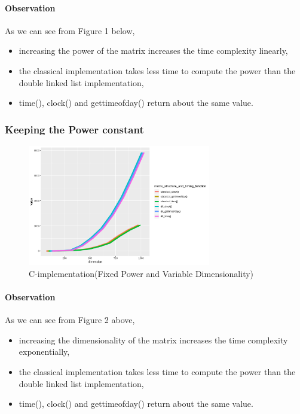 \documentclass[12pt]{article}
\begin{document}
				
				\paragraph{Observation}
					As we can see from Figure 1 below, 
					\begin{itemize}
						\item increasing the power of the matrix increases the time complexity linearly,
						\item the classical implementation takes less time to compute the power than the double linked list implementation,
						\item time(), clock() and gettimeofday() return about the same value.
					\end{itemize}
	\newpage
				
			\subsubsection{Keeping the Power constant}
				\begin{figure}[h]
					\includegraphics[width= 8cm]{../images/C_fixed_power.png}
					\caption{C-implementation(Fixed Power and Variable Dimensionality)}
				\end{figure}
				
				\paragraph{Observation}
				As we can see from Figure 2 above, 
				\begin{itemize}
					\item increasing the dimensionality of the matrix increases the time complexity exponentially,
					\item the classical implementation takes less time to compute the power than the double linked list implementation,
					\item time(), clock() and gettimeofday() return about the same value.
				\end{itemize}
\end{document}
